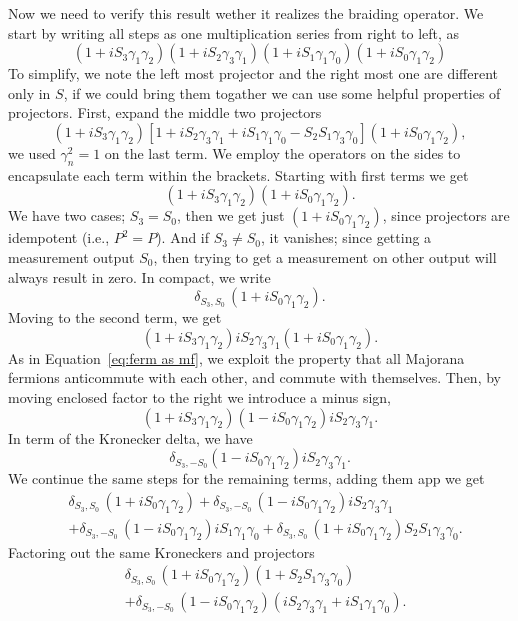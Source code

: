 \documentclass{article}
\begin{document}
Now we need to verify this result wether it realizes the braiding operator. We start by writing all steps as one multiplication series from right to left, as
\[
	(1 + iS_3 \gamma_1 \gamma_2) (1 + iS_2 \gamma_3 \gamma_1) (1 + iS_1 \gamma_1 \gamma_0) (1 + iS_0 \gamma_1 \gamma_2)
\]
To simplify, we note the left most projector and the right most one are different only in $ S $, if we could bring them togather we can use some helpful properties of projectors. First, expand the middle two projectors
\[
	(1 + iS_3 \gamma_1 \gamma_2)
	[1 + iS_2 \gamma_3 \gamma_1 + iS_1 \gamma_1 \gamma_0 - S_2 S_1 \gamma_3 \gamma_0]
	(1 + iS_0 \gamma_1 \gamma_2),
\]
we used $ \gamma_n^2 = 1 $ on the last term. We employ the operators on the sides to encapsulate each term within the brackets. Starting with first terms we get
\[
	(1 + iS_3 \gamma_1 \gamma_2) (1 + iS_0 \gamma_1 \gamma_2).
\]
We have two cases; $ S_3 = S_0 $, then we get just $ (1 + iS_0 \gamma_1 \gamma_2) $, since projectors are idempotent (i.e., $ P^2 = P $). And if $ S_3 \ne S_0 $, it vanishes; since getting a measurement output $ S_0 $, then trying to get a measurement on other output will always result in zero. In compact, we write
\[
	\delta_{S_3, S_0} \, (1 + iS_0 \gamma_1 \gamma_2).
\]
Moving to the second term, we get
\[
	(1 + iS_3 \gamma_1 \gamma_2) iS_2 \gamma_3 \gamma_1 (1 + iS_0 \gamma_1 \gamma_2).
\]
As in Equation~\ref{eq:ferm as mf}, we exploit the property that all Majorana fermions anticommute with each other, and commute with themselves. Then, by moving enclosed factor to the right we introduce a minus sign,
\[
	(1 + iS_3 \gamma_1 \gamma_2)(1 - iS_0 \gamma_1 \gamma_2) iS_2 \gamma_3 \gamma_1 .
\]
In term of the Kronecker delta, we have
\[
	\delta_{S_3, -S_0}(1 - iS_0 \gamma_1 \gamma_2)iS_2 \gamma_3 \gamma_1 .
\]
We continue the same steps for the remaining terms, adding them app we get
\[
	\begin{aligned}
		 & \delta_{S_3, S_0} \, (1 + iS_0 \gamma_1 \gamma_2)
		+\delta_{S_3, -S_0}\, (1 - iS_0 \gamma_1 \gamma_2)iS_2 \gamma_3 \gamma_1    \\
		 & +\delta_{S_3, -S_0}\, (1 - iS_0 \gamma_1 \gamma_2)iS_1 \gamma_1 \gamma_0
		+\delta_{S_3, S_0}\, (1 + iS_0 \gamma_1 \gamma_2)S_2 S_1 \gamma_3 \gamma_0 .
	\end{aligned}
\]
Factoring out the same Kroneckers and projectors
\[
	\begin{aligned}
		 & \delta_{S_3, S_0} \, (1 + iS_0 \gamma_1 \gamma_2)  ( 1 + S_2 S_1 \gamma_3 \gamma_0 )                    \\
		 & +\delta_{S_3, -S_0} \, (1 - iS_0 \gamma_1 \gamma_2) ( iS_2 \gamma_3 \gamma_1 +iS_1 \gamma_1 \gamma_0) .
	\end{aligned}
\]
\end{document}
